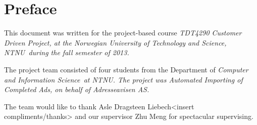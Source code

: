 \section{Preface}
This document was written for the project-based course \em TDT4290 Customer Driven Project\em, at the \em Norwegian University of Technology and Science, NTNU\em \ during the fall semester of 2013.

The project team consisted of four students from the Department of \em Computer and Information Science\em \ at \em NTNU\em. The project was \em Automated Importing of Completed Ads\em, on behalf of \em Adresseavisen AS\em.

The team would like to thank Asle Dragsteen Liebech<insert compliments/thanks> and our supervisor Zhu Meng for spectacular supervising.
